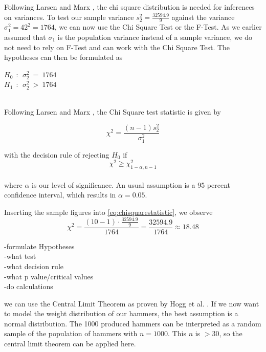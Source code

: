 Following Larsen and Marx \cite[Chapter 7.5]{larsen2005introduction}, the chi square distribution is needed for inferences on variances. To test our sample variance $s_2^2 = \frac{32594.9}{9}$ against the variance $\sigma^2_1 = 42^2 = 1764$, we can now use the Chi Square Test or the F-Test. As we earlier assumed that $\sigma_1$ is the population variance instead of a sample variance, we do not need to rely on F-Test and can work with the Chi Square Test. The hypotheses can then be formulated as 
\\
\begin{center}
$H_0~~:~~ \sigma^2_2~=~1764$\\ 
$H_1~~:~~ \sigma^2_2~>~1764$
\end{center}
\\
Following Larsen and Marx \cite[Chapter 7.5]{larsen2005introduction}, the Chi Square test statistic is given by 

\begin{equation}
\chi^2 = \frac{(n-1)s_2^2}{\sigma_1^2}
\label{eq:chisquarestatistic}
\end{equation}

with the decision rule of rejecting $H_0$ if 
\\
\begin{equation}
\chi^2 \geq \chi^2_{1-\alpha,n-1}
\label{eq:decisionrule}
\end{equation}
\\

where $\alpha$ is our level of significance. An usual assumption is a 95 percent confidence interval, which results in $\alpha = 0.05$. 


Inserting the sample figures into \ref{eq:chisquarestatistic}, we observe 
\begin{equation}
\chi^2 = \frac{(10-1) \cdot \frac{32594.9}{9}}{1764} = \frac{32594.9}{1764} \approx 18.48
\label{eq:chisqstatcalc}
\end{equation}


-formulate Hypotheses\\
-what test\\
-what decision rule\\
-what p value/critical values\\
-do calculations




we can use the Central Limit Theorem as proven by Hogg et al. \cite[Theorem~5.3.1]{hogg}. 
If we now want to model the weight distribution of our hammers, the best assumption is a normal distribution. The 1000 produced hammers can be interpreted as a random sample of the population of hammers with $n = 1000$. This $n$ is $>30$, so the central limit theorem can be applied here. 



